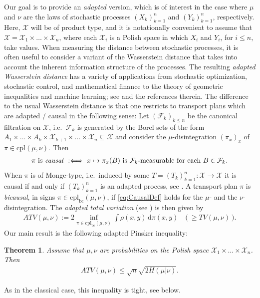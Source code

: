 \documentclass[10pt, A4paper]{amsart}
\newtheorem{theorem}{Theorem}[section]
\theoremstyle{definition}
\newcommand{\F}{\mathcal F}
\newcommand{\X}{\mathcal X}
\newcommand{\cpl}{\mathrm{cpl}}
\newcommand{\cplbc}{\cpl_{\mathrm{bc}}}
\newcommand{\dd}{\mathrm{d}}
\numberwithin{equation}{section}
\begin{document}
Our goal is to provide an \emph{adapted} version, which is of interest in the case where $\mu$ and $\nu$ are the laws of stochastic processes $(X_k)_{k=1}^n$ and $(Y_k)_{k=1}^n$, respectively. Here, $\X$ will be of product type, and it is notationally convenient to assume that $\X = \X_1 \times \ldots \times \X_n$, where each $\X_i$ is a Polish space in which $X_i$ and $Y_i$, for $i \leq n$, take values. When measuring the distance between stochastic processes, it is often useful to consider a variant of the Wasserstein distance that takes into account the inherent information structure of the processes. The resulting \emph{adapted Wasserstein distance} has a variety of applications from stochastic optimization, stochastic control, and mathematical finance to the theory of geometric inequalities and machine learning; see \cite{PfPi14, La18, XuAc21, BaBePa21, AcKraPa24, CoLi24, JiOb24, BaWi23} and the references therein.
The difference to the usual Wasserstein distance is that one restricts to transport plans which are adapted / causal in the following sense: Let $(\F_k)_{k\leq n}$ be the canonical filtration on $\X$, i.e.\ $\F_k$ is generated by the Borel sets of the form $A_1\times \ldots \times A_k\times \X_{k+1}\times \ldots \times \X_n\subseteq \X$ and consider the  $\mu$-disintegration $(\pi_x)_x$ of $\pi\in \cpl(\mu, \nu)$. Then 
\begin{align}\label{eq:CausalDef} \pi \text{ is \emph{causal} } :\Longleftrightarrow \ 
 x \mapsto \pi_x(B) \text{  is $\F_k$-measurable for each $B\in \F_k$.}
 \end{align}
When $\pi$ is of Monge-type, i.e.\ induced by some $T=(T_k)_{k=1}^n: \X\to \X$ it is causal if and only if $(T_k)_{k=1}^n$ is an adapted process, see \cite[Remark 2.3]{BaBeLiZa17}. 
A transport plan $\pi$ is \emph{bicausal}, in signs $\pi\in \cplbc(\mu, \nu)$, if \eqref{eq:CausalDef} holds for the $\mu$- and the $\nu$-disintegration.  %
The \emph{adapted total variation} (see \cite{EcPa22}) is then given by 
\begin{align*}%
ATV(\mu, \nu):= 2 \inf_{\pi\in \cplbc(\mu, \nu)} \int \rho(x,y)\, \dd\pi(x,y) \quad \big(\ \geq TV(\mu, \nu) \ \big) . 
\end{align*}
Our main result is the following adapted Pinsker inequality: 
\begin{theorem}\label{thm:MainTheorem}
  Assume that $\mu, \nu$ are probabilities on the Polish space $\X_1\times \ldots \times \X_n$. Then
  \begin{align}\label{eq:AP} 
  ATV(\mu, \nu)\leq \sqrt{n}\sqrt{2H(\mu|\nu)}.\end{align}
\end{theorem}
As in the classical case, this inequality is tight, see  below. 
\end{document}
